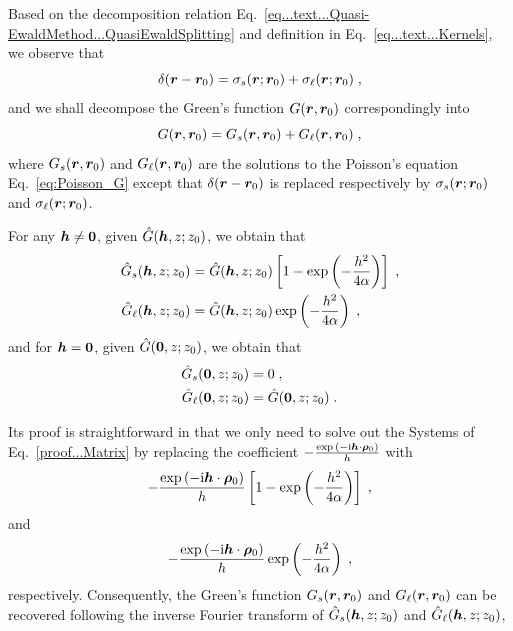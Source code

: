 Based on the decomposition relation Eq.~\eqref{eq...text...Quasi-EwaldMethod...QuasiEwaldSplitting} and definition in Eq.~\eqref{eq...text...Kernels}, we observe that 
\begin{equation}%
   \delta(\V{r}-\V{r}_0)=\sigma_s  (\V{r};\V{r}_0)+\sigma_\ell  (\V{r};\V{r}_0)\;,
\end{equation}
and we  shall decompose the Green's function  $ G(\boldsymbol{r}, \boldsymbol{r}_0)$ correspondingly into
\begin{equation}
    G(\boldsymbol{r}, \boldsymbol{r}_0)= G_s(\boldsymbol{r}, \boldsymbol{r}_0)+  G_\ell(\boldsymbol{r}, \boldsymbol{r}_0)\;,
\end{equation}
where $ G_s(\boldsymbol{r}, \boldsymbol{r}_0)$ and $  G_\ell(\boldsymbol{r}, \boldsymbol{r}_0)$ are the solutions to the Poisson's equation Eq.~\eqref{eq:Poisson_G} except that $\delta(\boldsymbol{r}-\boldsymbol{r}_0)$ is replaced respectively by $\sigma_s  (\boldsymbol{r};\boldsymbol{r}_0)$ and $\sigma_\ell  (\boldsymbol{r};\boldsymbol{r}_0)$.
\begin{corollary}
For any $\boldsymbol{h}\neq \bm{0}$, given     $\hat{G}(\boldsymbol{h}, z; z_0)$, we obtain that  
    \begin{align*}
        \hat{G}_s(\boldsymbol{h}, z; z_0)&=\hat{G}(\boldsymbol{h}, z; z_0)\left[1-\exp\left(-\frac{h^2}{4\alpha}\right)\right]\;,\\
        \hat{G}_\ell(\boldsymbol{h}, z; z_0)&=\hat{G}(\boldsymbol{h}, z; z_0)\exp\left(-\frac{h^2}{4\alpha}\right)\;,
    \end{align*} 
    and for  $\boldsymbol{h}=\bm{0}$, given     $\hat{G}(\bm{0}, z; z_0)$, we obtain that  
        \begin{align*}
        \hat{G}_s(\bm{0}, z; z_0)&=0\;,\\
        \hat{G}_\ell(\bm{0}, z; z_0)&=\hat{G}(\bm{0}, z; z_0)\;.
    \end{align*} 
\end{corollary}
Its proof is straightforward in that we only need to solve out the Systems of Eq.~\eqref{proof...Matrix} by replacing  the coefficient $-\frac{\exp{(-\mathrm{i} \boldsymbol{h} \cdot \boldsymbol{\rho}_0)}}{h }$ with  
\begin{equation*}
    -\frac{\exp{(-\mathrm{i} \boldsymbol{h} \cdot \boldsymbol{\rho}_0)}}{h }\left[1-\exp\left(-\frac{h^2}{4\alpha}\right)\right]\;,
\end{equation*}
and 
\begin{equation*}
    -\frac{\exp{(-\mathrm{i} \boldsymbol{h} \cdot \boldsymbol{\rho}_0)}}{h }\exp\left(-\frac{h^2}{4\alpha}\right)\;,
\end{equation*} 
respectively.
Consequently, the Green's function $ G_s(\boldsymbol{r}, \boldsymbol{r}_0)$ and $  G_\ell(\boldsymbol{r}, \boldsymbol{r}_0)$ can be recovered following the inverse Fourier transform of $  \hat{G}_s(\boldsymbol{h}, z; z_0)$ and $  \hat{G}_\ell(\boldsymbol{h}, z; z_0)$,
